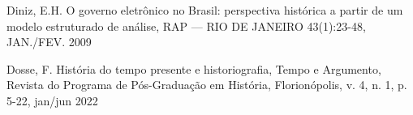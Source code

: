 \documentclass[
12pt,		%
openright,	%
twoside,  %
a4paper,			%
chapter=TITLE,		%
english,			%
french,				%
spanish,			%
brazil				%
]{USPSC-classe/USPSC}
\begin{document}
\begin{flushleft}
\begin{flushleft}
\begin{flushleft}
\begin{flushleft}
\begin{flushleft}
\begin{flushleft}
\begin{flushleft}
\begin{flushleft}
\begin{flushleft}
[DINIZ, 2009] Diniz, E.H. O governo eletr\^onico no Brasil: perspectiva hist\'orica a partir de um modelo estruturado de an\'alise, RAP — RIO DE JANEIRO 43(1):23-48, JAN./FEV. 2009
\end{flushleft}


\end{flushleft}


\end{flushleft}


\end{flushleft}


\end{flushleft}


\end{flushleft}


\end{flushleft}


\end{flushleft}


\end{flushleft}


\begin{flushleft}
\begin{flushleft}
\begin{flushleft}
\begin{flushleft}
\begin{flushleft}
\begin{flushleft}
\begin{flushleft}
\begin{flushleft}
\begin{flushleft}
[DOSSE, 2012] Dosse, F. Hist\'oria do tempo presente e historiografia, Tempo e Argumento, Revista do Programa de P\'os-Gradua\c{c}\~ao em Hist\'oria, Florion\'opolis, v. 4, n. 1, p. 5-22, jan/jun 2022
\end{flushleft}


\end{flushleft}


\end{flushleft}


\end{flushleft}


\end{flushleft}


\end{flushleft}


\end{flushleft}


\end{flushleft}


\end{flushleft}
\end{document}
